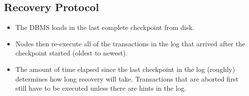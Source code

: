 \documentclass[11pt]{article}
\begin{document}
\subsection{Recovery Protocol}
\begin{itemize}
    \item
    The DBMS loads in the last complete checkpoint from disk.
    
    \item
    Nodes then re-execute all of the transactions in the log that arrived after the checkpoint 
    started (oldest to newest).
        
    \item
    The amount of time elapsed since the last checkpoint in the log (roughly) determines how 
    long recovery will take. Transactions that are aborted first still have to be executed unless 
    there are hints in the log.
\end{itemize}

\newpage


\end{document}
